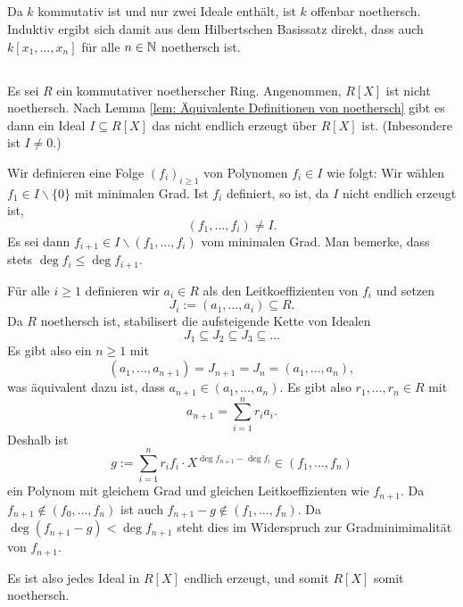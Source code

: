 \documentclass[a4paper,10pt]{article}
\begin{document}
\subsection{}
Da $k$ kommutativ ist und nur zwei Ideale enthält, ist $k$ offenbar noethersch. Induktiv ergibt sich damit aus dem Hilbertschen Basissatz direkt, dass auch $k[x_1, \ldots, x_n]$ für alle $n \in \mathbb{N}$ noethersch ist.


\subsection{}
Es sei $R$ ein kommutativer noetherscher Ring. Angenommen, $R[X]$ ist nicht noethersch. Nach Lemma \ref{lem: Äquivalente Definitionen von noethersch} gibt es dann ein Ideal $I \subseteq R[X]$ das nicht endlich erzeugt über $R[X]$ ist. (Inbesondere ist $I \neq 0$.)

Wir definieren eine Folge $(f_i)_{i \geq 1}$ von Polynomen $f_i \in I$ wie folgt: Wir wählen $f_1 \in I \smallsetminus \{0\}$ mit minimalen Grad. Ist $f_i$ definiert, so ist, da $I$ nicht endlich erzeugt ist,
\[
 (f_1, \ldots, f_i) \neq I.
\]
Es sei dann $f_{i+1} \in I \smallsetminus (f_1, \ldots, f_i)$ vom minimalen Grad. Man bemerke, dass stets $\deg f_i \leq \deg f_{i+1}$.

Für alle $i \geq 1$ definieren wir $a_i \in R$ als den Leitkoeffizienten von $f_i$ und setzen
\[
 J_i := (a_1, \ldots, a_i) \subseteq R.
\]
Da $R$ noethersch ist, stabilisert die aufsteigende Kette von Idealen
\[
 J_1 \subseteq J_2 \subseteq J_3 \subseteq \ldots
\]
Es gibt also ein $n \geq 1$ mit
\[
 (a_1, \ldots, a_{n+1}) = J_{n+1} = J_n = (a_1, \ldots, a_n),
\]
was äquivalent dazu ist, dass $a_{n+1} \in (a_1, \ldots, a_n)$. Es gibt also $r_1, \ldots, r_n \in R$ mit
\[
 a_{n+1} = \sum_{i=1}^n r_i a_i.
\]
Deshalb ist
\[
 g := \sum_{i=1}^n r_i f_i \cdot X^{\deg f_{n+1} - \deg f_i} \in (f_1, \ldots, f_n)
\]
ein Polynom mit gleichem Grad und gleichen Leitkoeffizienten wie $f_{n+1}$. Da $f_{n+1} \not\in (f_0, \ldots, f_n)$ ist auch $f_{n+1}-g \not\in (f_1, \ldots, f_n)$. Da $\deg (f_{n+1}-g) < \deg f_{n+1}$ steht dies im Widerspruch zur Gradminimimalität von $f_{n+1}$.

Es ist also jedes Ideal in $R[X]$ endlich erzeugt, und somit $R[X]$ somit noethersch.
\end{document}
